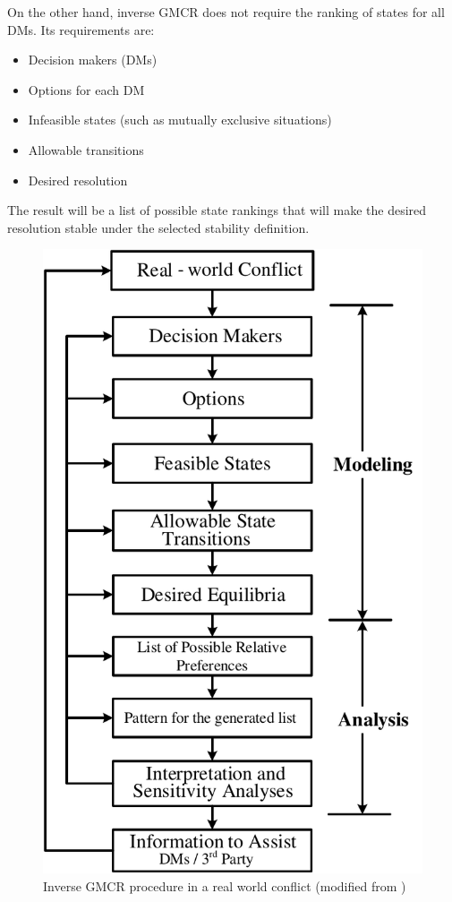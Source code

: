 \documentclass[letterpaper,12pt,titlepage,oneside,final]{book}
\begin{document}
\noindent On the other hand, inverse GMCR does not require the ranking of states for all DMs. Its requirements are:
\begin{itemize}
\item Decision makers (DMs)
\item Options for each DM
\item Infeasible states (such as mutually exclusive situations)
\item Allowable transitions
\item Desired resolution
\end{itemize}
\noindent The result will be a list of possible state rankings that will make the desired resolution stable under the selected stability definition.


\begin{center}
\begin{figure}
\centering
\includegraphics[scale=0.55]{PDF-IMG/GMCR_inv.pdf}

\caption{Inverse GMCR procedure in a real world conflict (modified from \cite{fang1993})}

\label{fig:procedure_inv}
\end{figure}
\end{center}
\end{document}
